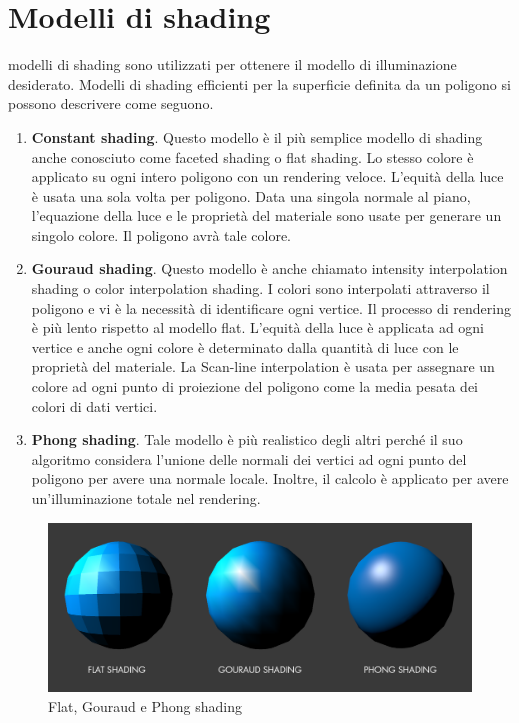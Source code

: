 \documentclass[9pt,a4paper,twoside]{tau}
\begin{document}
\section{Modelli di shading}
 modelli di shading sono utilizzati per ottenere il modello di illuminazione desiderato. Modelli di shading efficienti per la superficie definita da un poligono si possono descrivere come seguono.
\begin{enumerate}
	\item \textbf{Constant shading}. Questo modello è il più semplice modello di shading anche conosciuto come faceted shading o flat shading. Lo stesso colore è applicato su ogni intero poligono con un rendering veloce. L'equità della luce è usata una sola volta per poligono. Data una singola normale al piano, l'equazione della luce e le proprietà del materiale sono usate per generare un singolo colore. Il poligono avrà tale colore.
		
	\item \textbf{Gouraud shading}. Questo modello è anche chiamato intensity interpolation shading o color interpolation shading. I colori sono interpolati attraverso il poligono e vi è la necessità di identificare ogni vertice. Il processo di rendering è più lento rispetto al modello flat. L'equità della luce è applicata ad ogni vertice e anche ogni colore è determinato dalla quantità di luce con le proprietà del materiale. La Scan-line interpolation è usata per assegnare un colore ad ogni punto di proiezione del poligono come la media pesata dei colori di dati vertici.
	\item \textbf{Phong shading}. Tale modello è più realistico degli altri perché il suo algoritmo considera l'unione delle normali dei vertici ad ogni punto del poligono per avere una normale locale. Inoltre, il calcolo è applicato per avere un'illuminazione totale nel rendering.
\end{enumerate}
\begin{figure}[H]
    \centering
    \includegraphics[width=0.7\columnwidth]{Figures/07.png}
    \caption{Flat, Gouraud e Phong shading}
    \label{fig:figure}
\end{figure}
\end{document}
